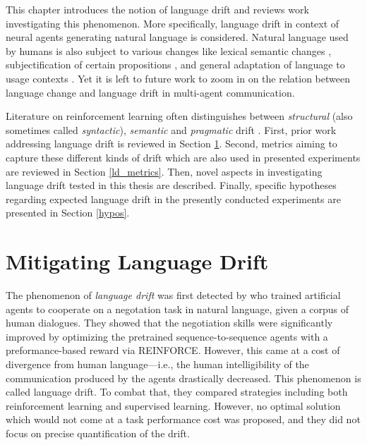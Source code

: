 This chapter introduces the notion of language drift and reviews work investigating this phenomenon. More specifically, language drift in context of neural agents generating natural language is considered. Natural language used by humans is also subject to various changes like lexical semantic changes \parencite{blank1999new}, subjectification of certain propositions \parencite{traugott1989rise},  and general adaptation of language to usage contexts \parencite{five2009language}. Yet it is left to future work to zoom in on the relation between language change and language drift in multi-agent communication. 

Literature on reinforcement learning often distinguishes between \textit{structural} (also sometimes called \textit{syntactic}), \textit{semantic} and \textit{pragmatic} drift \parencite{lazaridou2020multi}.
First, prior work addressing language drift is reviewed in Section \ref{ld_mitigation}. Second, metrics aiming to capture these different kinds of drift which are also used in presented experiments are reviewed in Section \ref{ld_metrics}. Then, novel aspects in investigating language drift tested in this thesis are described. Finally, specific hypotheses regarding expected language drift in the presently conducted experiments are presented in Section \ref{hypos}. 

\section{Mitigating Language Drift}
\label{ld_mitigation}
The phenomenon of \textit{language drift} was first detected by \cite{lewis2017deal} who trained artificial agents to cooperate on a negotation task in natural language, given a corpus of human dialogues. They showed that the negotiation skills were significantly improved by optimizing the pretrained sequence-to-sequence agents with a preformance-based reward via REINFORCE. However, this came at a cost of divergence from human language---i.e., the human intelligibility of the communication produced by the agents drastically decreased. This phenomenon is called language drift. To combat that, they compared strategies including both reinforcement learning and supervised learning. However, no optimal solution which would not come at a task performance cost was proposed, and they did not focus on precise quantification of the drift. 

